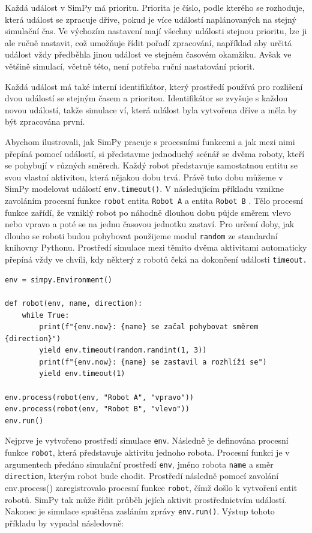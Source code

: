 \documentclass[
  program=itp,
  biblatex,
  figures=false,
  glossaries,
  index
]{kidiplom}
\begin{document}
Každá událost v SimPy má prioritu. Priorita je číslo, podle kterého se rozhoduje, která událost se zpracuje dříve, pokud je více událostí naplánovaných na stejný simulační čas.
Ve výchozím nastavení mají všechny události stejnou prioritu, lze ji ale ručně nastavit, což umožňuje řídit pořadí zpracování, například aby určitá událost vždy předběhla jinou událost ve stejném časovém okamžiku. Avšak ve většině simulací, včetně této, není potřeba ruční nastatování priorit.

Každá událost má také interní identifikátor, který prostředí používá pro rozlišení dvou událostí se stejným časem a prioritou.
Identifikátor se zvyšuje s každou novou událostí, takže simulace ví, která událost byla vytvořena dříve a měla by být zpracována první.

\noindent Abychom ilustrovali, jak SimPy pracuje s procesními funkcemi a jak mezi nimi přepíná pomocí událostí, si představme jednoduchý scénář se dvěma roboty, kteří se pohybují v různých směrech. Každý robot představuje samostatnou entitu se svou vlastní aktivitou, která nějakou dobu trvá. Právě tuto dobu můžeme v SimPy modelovat  událostí \texttt{env.timeout()}. V následujícím příkladu vznikne zavoláním procesní funkce \texttt{robot} entita \texttt{Robot A} a entita \texttt{Robot B} .
Tělo procesní funkce zařídí, že vzniklý robot po náhodně dlouhou dobu půjde směrem vlevo nebo vpravo a poté se na jednu časovou jednotku zastaví. Pro určení doby, jak dlouho se roboti budou pohybovat použijeme modul \texttt{random} ze standardní knihovny Pythonu. Prostředí simulace mezi těmito dvěma aktivitami automaticky přepíná vždy ve chvíli, kdy některý z robotů čeká na dokončení události \texttt{timeout.}

 \begin{verbatim} 
env = simpy.Environment()

def robot(env, name, direction):
    while True:
        print(f"{env.now}: {name} se začal pohybovat směrem {direction}")
        yield env.timeout(random.randint(1, 3))
        print(f"{env.now}: {name} se zastavil a rozhlíží se")
        yield env.timeout(1)       

env.process(robot(env, "Robot A", "vpravo"))
env.process(robot(env, "Robot B", "vlevo"))
env.run()
\end{verbatim}

\noindent Nejprve je vytvořeno prostředí simulace \texttt{env}. Následně je definována procesní funkce \texttt{robot}, která představuje aktivitu jednoho robota. Procesní funkci je v argumentech předáno simulační prostředí \texttt{env}, jméno robota \texttt{name} a směr \texttt{direction}, kterým robot bude chodit. Prostředí následně pomocí zavolání env.process() zaregistrovalo procesní funkce \texttt{robot}, čímž došlo k vytvoření entit robotů. SimPy tak může řídit průběh jejích aktivit prostřednictvím událostí. Nakonec je simulace spuštěna zasláním zprávy \texttt{env.run()}. Výstup tohoto příkladu by vypadal následovně:
\end{document}
